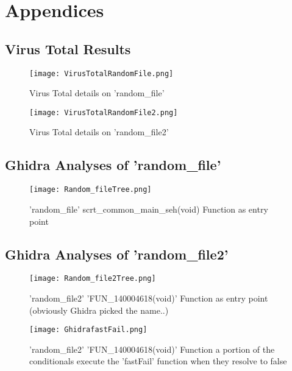 \documentclass[
	letterpaper, %
	10pt, %
	unnumberedsections, %
	twoside, %
]{APAAssignment}
\begin{document}
\chapter{Appendices}
\begin{appendices}

\section{Virus Total Results}\label{app:VirusTotal}
\begin{figure}[!htp] %
	\centering
	\texttt{[image: VirusTotalRandomFile.png]}
	\caption{Virus Total details on 'random\_file'}
	\label{fig:VirusTotalRandomFile}
\end{figure}

\begin{figure}[!htp] %
	\centering
	\texttt{[image: VirusTotalRandomFile2.png]}
	\caption{Virus Total details on 'random\_file2'}
	\label{fig:VirusTotalRandomFile2}
\end{figure}
\clearpage
\section{Ghidra Analyses of 'random\_file'}\label{app:GhidraRandomFile}	
\begin{figure}[!htp] %
	\centering
	\texttt{[image: Random\_fileTree.png]}
	\caption{'random\_file' scrt\_common\_main\_seh(void) Function as entry point}
	\label{fig:GhidraRandomFileTree}
\end{figure}
\clearpage
\section{Ghidra Analyses of 'random\_file2'}\label{app:GhidraRandomFile2}	
\begin{figure}[!htp] %
	\centering
	\texttt{[image: Random\_file2Tree.png]}
	\caption{'random\_file2' 'FUN\_140004618(void)' Function as entry point (obviously Ghidra picked the name..)}
	\label{fig:GhidraRandomFile2Tree}
\end{figure}

\begin{figure}[!htp] %
	\centering
	\texttt{[image: GhidrafastFail.png]}
	\caption{'random\_file2' 'FUN\_140004618(void)' Function a portion of the conditionals execute the 'fastFail' function when they resolve to false}
	\label{fig:GhidraFastFail}
\end{figure}
\end{appendices}
\end{document}
